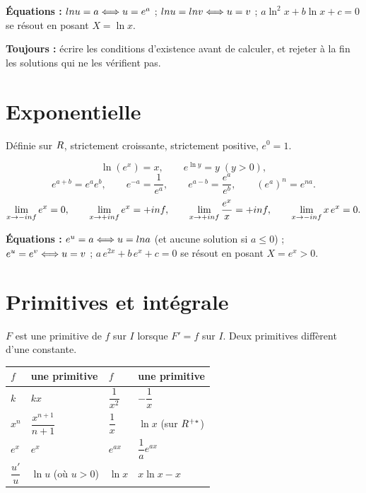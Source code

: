 \textbf{Équations :} $ln u = a \Longleftrightarrow u = e^{a}$ ;
$ln u = ln v \Longleftrightarrow u = v$ ;
$a\ln^{2}x+b\ln x+c = 0$ se résout en posant $X = \ln x$.

\textbf{Toujours :} écrire les conditions d'existence avant de calculer, et
rejeter à la fin les solutions qui ne les vérifient pas.

\section{Exponentielle}

Définie sur $R$, strictement croissante, strictement positive,
$e^{0} = 1$.

\[
  \ln\left(e^{x}\right) = x, \qquad e^{\ln y} = y \;(y>0),
\]
\[
  e^{a+b} = e^{a}e^{b}, \qquad e^{-a} = \frac{1}{e^{a}}, \qquad
  e^{a-b} = \frac{e^{a}}{e^{b}}, \qquad \left(e^{a}\right)^{n} = e^{na} .
\]
\[
  \limminf e^{x} = 0, \qquad \limpinf e^{x} = +\infty, \qquad
  \limpinf \frac{e^{x}}{x} = +\infty, \qquad \limminf x\,e^{x} = 0 .
\]

\textbf{Équations :} $e^{u} = a \Longleftrightarrow u = ln a$ (et aucune solution si
$a \leq 0$) ; $e^{u} = e^{v} \Longleftrightarrow u = v$ ;
$a\,e^{2x}+b\,e^{x}+c = 0$ se résout en posant $X = e^{x}>0$.

\section{Primitives et intégrale}

$F$ est une primitive de $f$ sur $I$ lorsque $F' = f$ sur $I$. Deux
primitives diffèrent d'une constante.

\begin{center}
\renewcommand{\arraystretch}{1.5}
\begin{tabular}{|L{3.2cm}|L{3.2cm}||L{2.6cm}|L{2.6cm}|}
\hline
\textbf{$f$} & \textbf{une primitive} & \textbf{$f$} &
\textbf{une primitive}\\
\hline
$k$ & $kx$ & $\dfrac{1}{x^{2}}$ & $-\dfrac1x$\\
$x^{n}$ & $\dfrac{x^{n+1}}{n+1}$ & $\dfrac1x$ & $\ln x$ (sur $R^{+*}$)\\
$e^{x}$ & $e^{x}$ & $e^{ax}$ & $\dfrac1a e^{ax}$\\
$\dfrac{u'}{u}$ & $\ln u$ (où $u>0$) & $\ln x$ & $x\ln x-x$\\
\hline
\end{tabular}
\end{center}

